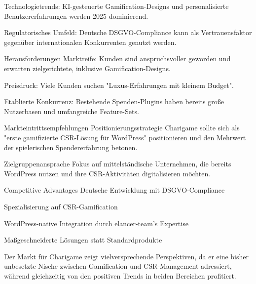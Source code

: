 Technologietrends: KI-gesteuerte Gamification-Designs und personalisierte Benutzererfahrungen werden 2025 dominierend.

Regulatorisches Umfeld: Deutsche DSGVO-Compliance kann als Vertrauensfaktor gegenüber internationalen Konkurrenten genutzt werden.

Herausforderungen
Marktreife: Kunden sind anspruchsvoller geworden und erwarten zielgerichtete, inklusive Gamification-Designs.

Preisdruck: Viele Kunden suchen "Luxus-Erfahrungen mit kleinem Budget".

Etablierte Konkurrenz: Bestehende Spenden-Plugins haben bereits große Nutzerbasen und umfangreiche Feature-Sets.

Markteintrittsempfehlungen
Positionierungsstrategie
Charigame sollte sich als "erste gamifizierte CSR-Lösung für WordPress" positionieren und den Mehrwert der spielerischen Spendererfahrung betonen.

Zielgruppenansprache
Fokus auf mittelständische Unternehmen, die bereits WordPress nutzen und ihre CSR-Aktivitäten digitalisieren möchten.

Competitive Advantages
Deutsche Entwicklung mit DSGVO-Compliance

Spezialisierung auf CSR-Gamification

WordPress-native Integration durch elancer-team's Expertise

Maßgeschneiderte Lösungen statt Standardprodukte

Der Markt für Charigame zeigt vielversprechende Perspektiven, da er eine bisher unbesetzte Nische zwischen Gamification und CSR-Management adressiert, während gleichzeitig von den positiven Trends in beiden Bereichen profitiert.


